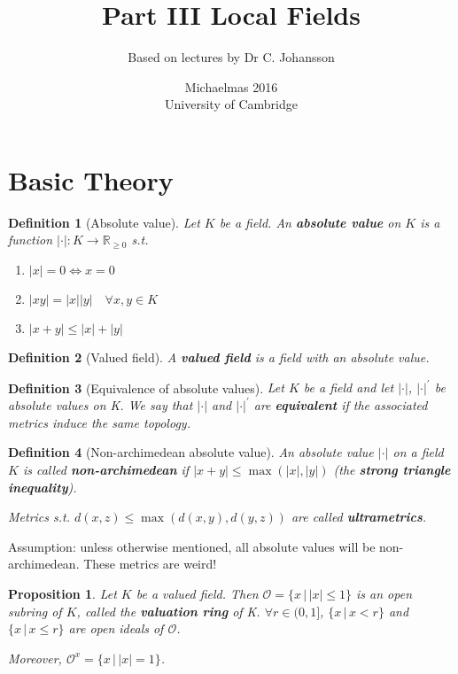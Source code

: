 \documentclass[a4paper]{article}
\title{Part III Local Fields}
\author{Based on lectures by Dr C. Johansson}
\date{Michaelmas 2016\\University of Cambridge}
\newtheorem*{definition}{Definition}
\newtheorem{prop}[lemma]{Proposition}
\newcommand*\abs[1]{\left|#1\right|}
\begin{document}
\maketitle
\tableofcontents

\section{Basic Theory}
\begin{definition}[Absolute value]
	Let $K$ be a field. An \textbf{absolute value} on $K$ is a function $\abs{\cdot}:K\to\mathbb{R}_{\geq 0}$ s.t.
	\begin{enumerate}[label=\roman*.]
		\item $\abs{x}=0 \iff x=0$
		\item $\abs{xy}=\abs{x}\abs{y} \quad \forall x,y \in K$
		\item $\abs{x+y} \leq \abs{x} + \abs{y}$
	\end{enumerate}
\end{definition}

\begin{definition}[Valued field]
	A \textbf{valued field} is a field with an absolute value.
\end{definition}

\begin{definition}[Equivalence of absolute values]
	Let $K$ be a field and let $\abs{\cdot}$, $\abs{\cdot}^{'}$ be absolute values on K. We say that $\abs{\cdot}$ and $\abs{\cdot}^{'}$ are \textbf{equivalent} if the associated metrics induce the same topology.
\end{definition}

\begin{definition}[Non-archimedean absolute value]
	An absolute value $\abs{\cdot}$ on a field $K$ is called \textbf{non-archimedean} if $\abs{x+y}\leq\max(\abs{x},\abs{y})$ (the \textbf{strong triangle inequality}).
	
	Metrics s.t. $d(x,z)\leq\max(d(x,y),d(y,z))$ are called \textbf{ultrametrics}.
\end{definition}

Assumption: unless otherwise mentioned, all absolute values will be non-archimedean. These metrics are weird!

\begin{prop}
	Let $K$ be a valued field. Then $\mathcal{O}=\{x \,|\, \abs{x}\leq 1\}$ is an open subring of $K$, called the \textbf{valuation ring} of K. $\forall r \in (0,1]$, $\{x \,|\, x < r\}$ and $\{x \,|\, x \leq r\}$ are open ideals of $\mathcal{O}$.
	
	Moreover, $\mathcal{O}^x = \{x \,|\, \abs{x}=1\}$.
\end{prop}
\end{document}

